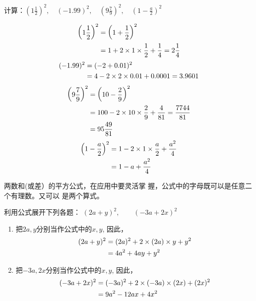 \begin{example}
计算：$\left(1\frac{1}{2}\right)^2,\quad (-1.99)^2,\quad \left(9\frac{7}{9}\right)^2,\quad \left(1-\frac{a}{2}\right)^2$
\end{example}

\begin{solution}
\[\begin{split}
    \left(1\dfrac{1}{2}\right)^2 &=\left(1+\dfrac{1}{2}\right)^2\\
    &=1+2\times1\times\dfrac{1}{2}+\dfrac{1}{4}=2\dfrac{1}{4}
\end{split}\]
\[\begin{split}
    (-1.99)^2&=(-2+0.01)^2\\
    &=4-2\times 2\times 0.01+0.0001=3.9601
\end{split}\]
\[\begin{split}
    \left(9\dfrac{7}{9}\right)^2&=\left(10-\dfrac{2}{9}\right)^2\\
    &=100-2\times 10\times \dfrac{2}{9}+\dfrac{4}{81}=\dfrac{7744}{81}\\
    &=95\dfrac{49}{81}
\end{split}\]
\[\begin{split}
    \left(1-\dfrac{a}{2}\right)^2&=1-2\times 1\times \dfrac{a}{2}+\dfrac{a^2}{4}\\
    &=1-a+\dfrac{a^2}{4}
\end{split}\]
\end{solution}

两数和(或差）的平方公式，在应用中要灵活掌
握，公式中的字母既可以是任意二个有理数。又可以
是两个算式。


\begin{example}
    利用公式展开下列各题：
$(2a+y)^2,\qquad (-3a+2x)^2$
\end{example}


\begin{solution}
\begin{enumerate}
    \item 把$2a,y$分别当作公式中的$x,y$, 因此，
\[\begin{split}
    (2a+y)^2&=(2a)^2+2\times(2a)\times y+y^2\\
&=4a^2+4ay+y^2
\end{split}\]
\item 把$-3a,2x$分别当作公式中的$x,y$, 因此，
\[\begin{split}
    (-3a+2x)^2&=(-3a)^2+2\times(-3a)\times(2x)+(2x)^2\\
    &= 9a^2-12ax+4x^2
\end{split}\]
\end{enumerate}
\end{solution}
    


